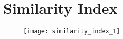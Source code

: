 \chapter{Similarity Index}

\begin{figure}[!h]
        \center
        \texttt{[image: similarity\_index\_1]}
\end{figure}
